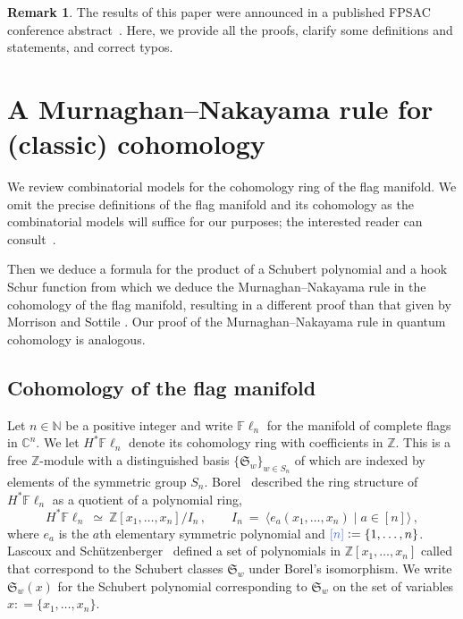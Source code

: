 \documentclass[12pt,oneside,reqno]{amsart}
\theoremstyle{definition}
\newtheorem{remark}[theorem]{Remark}
\numberwithin{equation}{section}
\newcommand{\Fln}{{\mathbb F}\ell_n}
\newcommand{\CC}{{\mathbb C}}
\newcommand{\NN}{{\mathbb N}}
\newcommand{\ZZ}{{\mathbb Z}}
\newcommand{\frakS}{{\mathfrak S}}
\newcommand{\defcolor}[1]{{\color{RoyalBlue}#1}}
\newcommand{\demph}[1]{\defcolor{{\sl #1}}}
\begin{document}
\begin{remark}\label{rem:fpsac}
The results of this paper were announced in a published FPSAC conference abstract~\cite{FPSAC23}. Here, we provide all the proofs, clarify some definitions and statements, and correct typos.
\end{remark}


\section{A Murnaghan--Nakayama rule for (classic) cohomology}
\label{sec:classic-mn-rule}

We review combinatorial models for the cohomology ring of the flag manifold.
We omit the precise definitions of the flag manifold and
its cohomology as the combinatorial models will suffice for our purposes; the
interested reader can consult~\cite{Fu97}.

Then we deduce a formula for the product of a Schubert polynomial and a hook
Schur function from which we deduce the Murnaghan--Nakayama rule in the
cohomology of the flag manifold, resulting in a different proof than that given by Morrison and Sottile \cite{MorrisonSottile}.
Our proof of the Murnaghan--Nakayama rule in quantum cohomology is analogous.


\subsection{Cohomology of the flag manifold}
\label{cohomology-ring-of-the-flag-manifold}

Let $n\in\NN$ be  a positive integer and write \defcolor{$\Fln$} for the manifold of complete flags in $\CC^n$.
We let \defcolor{$H^*\Fln$} denote its cohomology ring with coefficients in $\ZZ$.
This is a free $\ZZ$-module with a distinguished basis
\defcolor{$\{\frakS_w\}_{w \in S_n}$} of \demph{Schubert classes} which are indexed by elements of the symmetric group
\defcolor{$S_n$}. 
Borel~\cite{Borel} described the ring structure of $H^*\Fln$ as a quotient of a polynomial ring,
%
 \begin{equation}
    \label{borel-presentation}
    H^* \Fln\ \simeq\ \ZZ[x_1,\dotsc,x_n] / I_n\,,
    \qquad I_n\ =\ \big\langle e_a(x_1,\dotsc,x_n)\mid a \in [n] \big\rangle\,,
 \end{equation}
%
where $e_a$ is the $a$th elementary symmetric polynomial and
$\defcolor{[n]}\vcentcolon=\{1,\dots,n\}$.
Lascoux and Sch\"utzen\-ber\-ger~\cite{LaSch82} defined a set of polynomials in
$\ZZ[x_1, \ldots, x_n]$ called \demph{Schubert polynomials} that correspond to
the Schubert classes $\frakS_w$ under Borel's isomorphism.
We write $\frakS_w(x)$ for the Schubert polynomial corresponding to $\frakS_w$
on the set of variables $x: = \{x_1, \ldots, x_n\}$.
\end{document}

